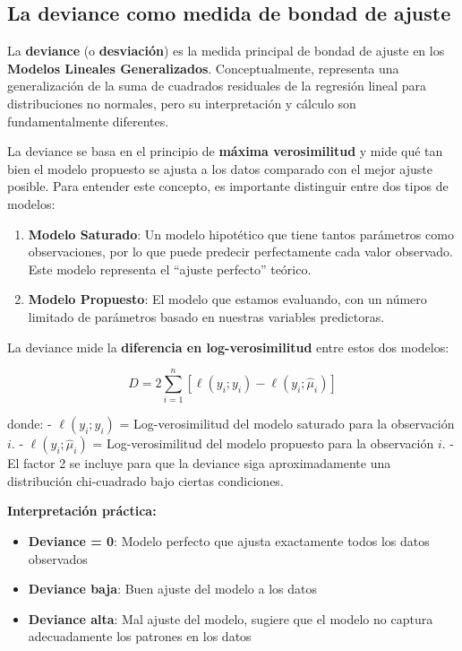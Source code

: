 \documentclass[
  letterpaper,
  DIV=11,
  numbers=noendperiod]{scrreprt}
\providecommand{\tightlist}{%
  \setlength{\itemsep}{0pt}\setlength{\parskip}{0pt}}
\begin{document}
\subsection{La deviance como medida de bondad de
ajuste}\label{la-deviance-como-medida-de-bondad-de-ajuste}

La \textbf{deviance} (o \textbf{desviación}) es la medida principal de
bondad de ajuste en los \textbf{Modelos Lineales Generalizados}.
Conceptualmente, representa una generalización de la suma de cuadrados
residuales de la regresión lineal para distribuciones no normales, pero
su interpretación y cálculo son fundamentalmente diferentes.

La deviance se basa en el principio de \textbf{máxima verosimilitud} y
mide qué tan bien el modelo propuesto se ajusta a los datos comparado
con el mejor ajuste posible. Para entender este concepto, es importante
distinguir entre dos tipos de modelos:

\begin{enumerate}
\def\labelenumi{\arabic{enumi}.}
\item
  \textbf{Modelo Saturado}: Un modelo hipotético que tiene tantos
  parámetros como observaciones, por lo que puede predecir perfectamente
  cada valor observado. Este modelo representa el ``ajuste perfecto''
  teórico.
\item
  \textbf{Modelo Propuesto}: El modelo que estamos evaluando, con un
  número limitado de parámetros basado en nuestras variables
  predictoras.
\end{enumerate}

La deviance mide la \textbf{diferencia en log-verosimilitud} entre estos
dos modelos:

\[
D = 2 \sum_{i=1}^{n} \left[ \ell(y_i; y_i) - \ell(y_i; \hat{\mu}_i) \right]
\]

donde: - \(\ell(y_i; y_i)\) = Log-verosimilitud del modelo saturado para
la observación \(i\). - \(\ell(y_i; \hat{\mu}_i)\) = Log-verosimilitud
del modelo propuesto para la observación \(i\). - El factor 2 se incluye
para que la deviance siga aproximadamente una distribución chi-cuadrado
bajo ciertas condiciones.

\textbf{Interpretación práctica:}

\begin{itemize}
\tightlist
\item
  \textbf{Deviance = 0}: Modelo perfecto que ajusta exactamente todos
  los datos observados
\item
  \textbf{Deviance baja}: Buen ajuste del modelo a los datos
\item
  \textbf{Deviance alta}: Mal ajuste del modelo, sugiere que el modelo
  no captura adecuadamente los patrones en los datos
\end{itemize}
\end{document}
